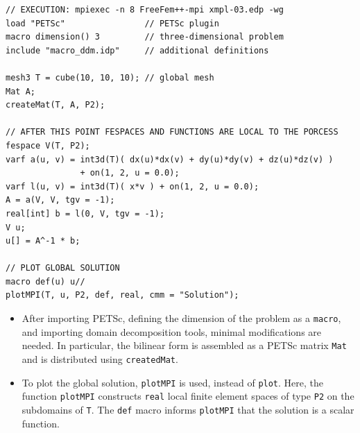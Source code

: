 \documentclass[9pt]{amsart}
\theoremstyle{remark}
\theoremstyle{definition}
\begin{document}
\begin{Verbatim}[commandchars=\\\{\}]
// EXECUTION: mpiexec -n 8 FreeFem++-mpi xmpl-03.edp -wg
load "PETSc"                // PETSc plugin
macro dimension() 3         // three-dimensional problem
include "macro_ddm.idp"     // additional definitions

mesh3 T = cube(10, 10, 10); // global mesh
Mat A;
createMat(T, A, P2);

// AFTER THIS POINT FESPACES AND FUNCTIONS ARE LOCAL TO THE PORCESS
fespace V(T, P2);
varf a(u, v) = int3d(T)( dx(u)*dx(v) + dy(u)*dy(v) + dz(u)*dz(v) )
               + on(1, 2, u = 0.0);
varf l(u, v) = int3d(T)( x*v ) + on(1, 2, u = 0.0);
A = a(V, V, tgv = -1);
real[int] b = l(0, V, tgv = -1);
V u;
u[] = A^-1 * b;

// PLOT GLOBAL SOLUTION
macro def(u) u//
plotMPI(T, u, P2, def, real, cmm = "Solution");
\end{Verbatim}
\begin{itemize}
\item After importing PETSc, defining the dimension of the problem as a \verb!macro!, and importing domain decomposition tools, minimal modifications are needed. In particular, the bilinear form is assembled as a PETSc matrix \verb!Mat! and is distributed using \verb!createdMat!.
\item To plot the global solution, \verb!plotMPI! is used, instead of \verb!plot!. Here, the function \verb!plotMPI! constructs \verb!real! local finite element spaces of type \verb!P2! on the subdomains of \verb!T!. The \verb!def! macro informs \verb!plotMPI! that the solution is a scalar function.
\end{itemize}
\end{document}
